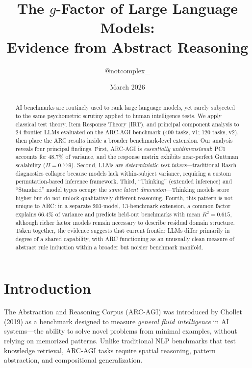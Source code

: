 \documentclass[11pt, letterpaper]{article}
\title{\textbf{The $g$-Factor of Large Language Models:\\
Evidence from Abstract Reasoning}}
\author{@notcomplex\_}
\date{March 2026}
\begin{document}
\maketitle

\begin{abstract}
AI benchmarks are routinely used to rank large language models, yet rarely subjected to the same psychometric scrutiny applied to human intelligence tests. We apply classical test theory, Item Response Theory (IRT), and principal component analysis to 24 frontier LLMs evaluated on the ARC-AGI benchmark (400 tasks, v1; 120 tasks, v2), then place the ARC results inside a broader benchmark-level extension. Our analysis reveals four principal findings. First, ARC-AGI is \textit{essentially unidimensional}: PC1 accounts for 48.7\% of variance, and the response matrix exhibits near-perfect Guttman scalability ($H = 0.779$). Second, LLMs are \textit{deterministic test-takers}---traditional Rasch diagnostics collapse because models lack within-subject variance, requiring a custom permutation-based inference framework. Third, ``Thinking'' (extended inference) and ``Standard'' model types occupy the \textit{same latent dimension}---Thinking models score higher but do not unlock qualitatively different reasoning. Fourth, this pattern is not unique to ARC: in a separate 203-model, 13-benchmark extension, a common factor explains 66.4\% of variance and predicts held-out benchmarks with mean $R^2 = 0.615$, although richer factor models remain necessary to describe residual domain structure. Taken together, the evidence suggests that current frontier LLMs differ primarily in degree of a shared capability, with ARC functioning as an unusually clean measure of abstract rule induction within a broader but noisier benchmark manifold.
\end{abstract}

\section{Introduction}
\label{sec:intro}

The Abstraction and Reasoning Corpus (ARC-AGI) was introduced by Chollet (2019) as a benchmark designed to measure \textit{general fluid intelligence} in AI systems---the ability to solve novel problems from minimal examples, without relying on memorized patterns. Unlike traditional NLP benchmarks that test knowledge retrieval, ARC-AGI tasks require spatial reasoning, pattern abstraction, and compositional generalization.
\end{document}
